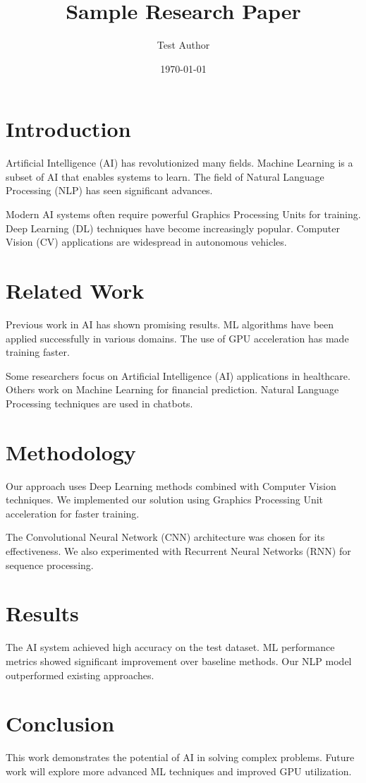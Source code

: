 \documentclass[12pt,a4paper]{article}
\title{Sample Research Paper}
\author{Test Author}
\date{\today}
\begin{document}
\maketitle

\section{Introduction}

Artificial Intelligence (AI) has revolutionized many fields. Machine Learning is a subset of AI that enables systems to learn. The field of Natural Language Processing (NLP) has seen significant advances.

Modern AI systems often require powerful Graphics Processing Units for training. Deep Learning (DL) techniques have become increasingly popular. Computer Vision (CV) applications are widespread in autonomous vehicles.

\section{Related Work}

Previous work in AI has shown promising results. ML algorithms have been applied successfully in various domains. The use of GPU acceleration has made training faster.

Some researchers focus on Artificial Intelligence (AI) applications in healthcare. Others work on Machine Learning for financial prediction. Natural Language Processing techniques are used in chatbots.

\section{Methodology}

Our approach uses Deep Learning methods combined with Computer Vision techniques. We implemented our solution using Graphics Processing Unit acceleration for faster training.

The Convolutional Neural Network (CNN) architecture was chosen for its effectiveness. We also experimented with Recurrent Neural Networks (RNN) for sequence processing.

\section{Results}

The AI system achieved high accuracy on the test dataset. ML performance metrics showed significant improvement over baseline methods. Our NLP model outperformed existing approaches.

\section{Conclusion}

This work demonstrates the potential of AI in solving complex problems. Future work will explore more advanced ML techniques and improved GPU utilization.
\end{document}
